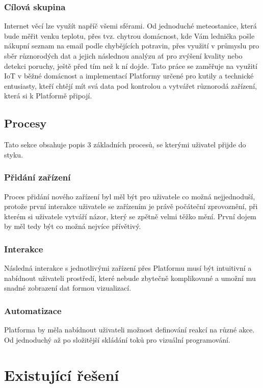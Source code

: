 \documentclass[thesis=B,czech]{FITthesis}[2019/12/23]
\begin{document}
\subsection{Cílová skupina}
    Internet věcí lze využít napříč všemi sférami. Od jednoduché meteostanice, která bude měřit venku teplotu, přes tvz. chytrou domácnost, kde Vám lednička pošle nákupní seznam na email podle chybějících potravin, přes využití v průmyslu pro sběr různorodých dat a jejich následnou analýzu ať pro zvýšení kvality nebo detekci poruchy, ještě před tím než k ní dojde. Tato práce se zaměřuje na využití IoT v běžné domácnost a implementací Platformy určené pro kutily a technické entusiasty, kteří chtějí mít svá data pod kontrolou a vytvářet různorodá zařízení, která si k Platformě připojí.
 

\section{Procesy} %
Tato sekce obsahuje popis 3 základních procesů, se kterými uživatel přijde do styku.

\subsection{Přidání zařízení}%
Proces přidání nového zařízení byl měl být pro uživatele co možná nejjednoduší, protože první interakce uživatele se zařízením je právě počáteční zprovoznění, při kterém si uživatele vytváří názor, který se zpětně velmi těžko mění. První dojem by měl tedy být co možná nejvíce přívětivý.

\subsection{Interakce}%
Následná interakce s jednotlivými zařízení přes Platformu musí být intuitivní a nabídnout uživateli prostředí, které nebude zbytečně komplikované a umožní mu snadné zobrazení dat formou vizualizací.

\subsection{Automatizace}%
Platforma by měla nabídnout uživateli možnost definování reakcí na různé akce. Od jednoduchý až po složitější skládání toků pro vizuální programování.

\chapter{Existující řešení}
\end{document}
